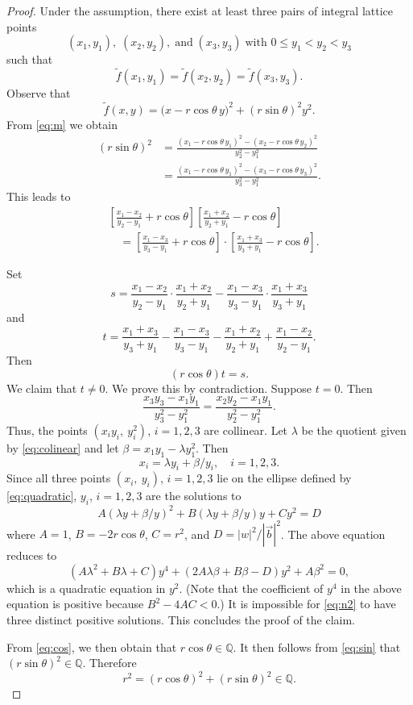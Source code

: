 \documentclass[10pt,a4paper]{amsart}
\begin{document}
\begin{proof}  Under the assumption, there exist at least three pairs of integral lattice points
\[
(x_1, y_1), \; (x_2, y_2),\; \text{and}\; (x_3, y_3) \; \text{with } 0 \leq y_1 < y_2 < y_3
\]
such that
\begin{equation}\label{eq:m}
\tilde f(x_1, y_1) = \tilde f(x_2, y_2) = \tilde f(x_3, y_3).
\end{equation}
Observe that
\[
\tilde f(x,y) = \bigl( x - r\cos\theta \, y \bigr)^2 + (r\sin\theta)^2 y^2.
\]
From \eqref{eq:m} we obtain
\begin{equation}\label{eq:sin}
	\begin{aligned}
(r\sin\theta)^2 &= \frac{(x_1 - r\cos\theta \, y_1)^2 - (x_2 - r\cos\theta \, y_2)^2}{y_2^2 - y_1^2}\\
&= \frac{(x_1 - r\cos\theta \, y_1)^2 - (x_3 - r\cos\theta \, y_3)^2}{y_3^2 - y_1^2}.
\end{aligned}
\end{equation}
This leads to
\begin{align*}
	&\left[ \frac{x_1 - x_2}{y_2 - y_1} + r \cos \theta \right] \left[ \frac{x_1 + x_2}{y_2 + y_1} - r \cos \theta \right] \\
	&\quad = \left[ \frac{x_1 - x_3}{y_3 - y_1} + r \cos \theta \right] \cdot \left[ \frac{x_1 + x_3}{y_3 + y_1} - r \cos \theta \right].
\end{align*}

Set
\[
s=\frac{x_1 - x_2}{y_2 - y_1} \cdot \frac{x_1 + x_2}{y_2 + y_1}
- \frac{x_1 - x_3}{y_3 - y_1} \cdot \frac{x_1 + x_3}{y_3 + y_1}
\]
and
\[
t=\frac{x_1 + x_3}{y_3 + y_1} - \frac{x_1 - x_3}{y_3 - y_1}
- \frac{x_1 + x_2}{y_2 + y_1} + \frac{x_1 - x_2}{y_2 - y_1}.
\]
Then
\begin{equation}\label{eq:cos}
(r\cos\theta) t=s.
\end{equation}
We claim that $t\not=0$.  We prove this by contradiction. Suppose $t=0$. Then
\begin{equation}\label{eq:colinear}
	\frac{x_3y_3 - x_1y_1}{y_3^2 - y_1^2} = \frac{x_2y_2 - x_1y_1}{y_2^2 - y_1^2}.
\end{equation}
Thus, the points $(x_iy_i,\ y_i^2)$, $i=1, 2, 3$ are collinear. Let $\lambda$ be the quotient given 
by \eqref{eq:colinear} and let $\beta=x_1y_1-\lambda y_1^2$.  Then 
\[
x_i=\lambda y_i+\beta/y_i, \quad i=1, 2, 3.
\]
Since all three points $(x_i,\ y_i)$, $i=1, 2, 3$ lie on the ellipse defined by \eqref{eq:quadratic}, $y_i$, $i=1, 2, 3$ are
the solutions to  
\[
A(\lambda y+\beta/y)^2+B(\lambda y+\beta/y)y+Cy^2=D
\]
where $A=1$, $B=-2r\cos\theta$, $C=r^2$, and $D=|w|^2/|\vec{b}|^2$.  The above equation reduces to
\begin{equation}\label{eq:n2}
(A\lambda^2+B\lambda+C)y^4+(2A\lambda\beta+B\beta-D)y^2+A\beta^2=0,
\end{equation}
which is a quadratic equation in $y^2$. (Note that the coefficient of $y^4$ in the above 
equation is positive because $B^2-4AC<0$.)  It is impossible for \eqref{eq:n2} to have 
three distinct positive solutions.  This concludes the proof of the claim.
  
From \eqref{eq:cos}, we then obtain that \( r \cos \theta \in \mathbb{Q} \).  It then follows from \eqref{eq:sin} that \( (r\sin\theta)^2 \in \mathbb{Q} \).  
Therefore
\[
r^2 = (r\cos\theta)^2 + (r\sin\theta)^2 \in \mathbb{Q}.
\]
\end{proof}
\end{document}
